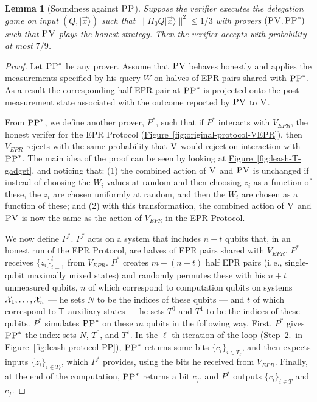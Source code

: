 \documentclass[11pt]{article}
\numberwithin{equation}{section}
\newtheorem{lemma}[theorem]{Lemma}
\theoremstyle{definition}
\theoremstyle{plain}
\newcommand{\ie}{i.\,e.}
\newcommand{\expref}[2]{\hyperref[#2]{#1~\ref{#2}}}
\newcommand{\ket}[1]{|#1\rangle}
\newcommand{\ver}{\textsc{V}}
\newcommand{\pv}{\textsc{PV}}
\newcommand{\pp}{\textsc{PP}}
\begin{document}
\begin{lemma}[Soundness against $\pp$]\label{lem:soundness-leash-pp}
Suppose the verifier executes the delegation  game on input $(Q,\ket{\vec{x}})$ such that $\|\Pi_0 Q\ket{\vec{x}}\|^2 \leq 1/3$ with provers $(\pv,\pp^*)$ such that $\pv$ plays the honest strategy. Then the verifier accepts with probability at most $7/9$. 
\end{lemma}

\begin{proof}
Let $\pp^*$ be any prover. Assume that $\pv$ behaves honestly and applies the measurements specified by his query $W$ on halves of EPR pairs shared with $\pp^*$. As a result the corresponding half-EPR pair at $\pp^*$ is projected onto the post-measurement state associated with the outcome reported by $\pv$ to $\ver$. 


From $\pp^*$, we define another prover, $P^*$, such that if $P^*$ interacts with $V_{EPR}$,  the honest verifer for the EPR Protocol (\expref{Figure}{fig:original-protocol-VEPR}), then $V_{EPR}$ rejects with the same probability that $\ver$ would reject on interaction with $\pp^*$. The main idea of the proof can be seen by looking at \expref{Figure}{fig:leash-T-gadget}, and noticing that: (1) the combined action of $\ver$ and $\pv$ is unchanged if instead of choosing the $W_i$-values at random and then choosing $z_i$ as a function of these, the $z_i$ are chosen uniformly at random, and then the $W_i$ are chosen as a function of these; and (2) with this transformation, the combined action of $\ver$ and $\pv$ is now the same as the action of $V_{EPR}$ in the EPR Protocol. 

We now define $P^*$. $P^*$ acts on a system that includes $n+t$ qubits that, in an honest run of the EPR Protocol, are halves of EPR pairs shared with $V_{EPR}$. $P^*$ receives $\{{z}_i\}_{i=1}^t$ from $V_{EPR}$. $P^*$ creates $m-(n+t)$ half EPR pairs (\ie, single-qubit maximally mixed states) and randomly permutes these with his $n+t$ unmeasured qubits, $n$ of which correspond to computation qubits on systems ${\cal X}_1,\dots,{\cal X}_n$ --- he sets $N$ to be the indices of these qubits --- and $t$ of which correspond to $\sf T$-auxiliary states --- he sets $T^0$ and $T^1$ to be the indices of these qubits. $P^*$ simulates $\pp^*$ on these $m$ qubits in the following way. First, $P^*$ gives $\pp^*$ the index sets $N$, $T^0$, and $T^1$. In the $\ell$-th iteration of the loop (Step~2.\ in \expref{Figure}{fig:leash-protocol-PP}), $\pp^*$ returns some bits $\{c_i\}_{i\in T_\ell}$, and then expects inputs $\{z_i\}_{i\in T_\ell}$, which $P^*$ provides, using the bits he received from $V_{EPR}$. Finally, at the end of the computation, $\pp^*$ returns a bit $c_f$, and $P^*$ outputs $\{c_i\}_{i\in T}$ and ${c_f}$. 


\end{proof}
\end{document}
